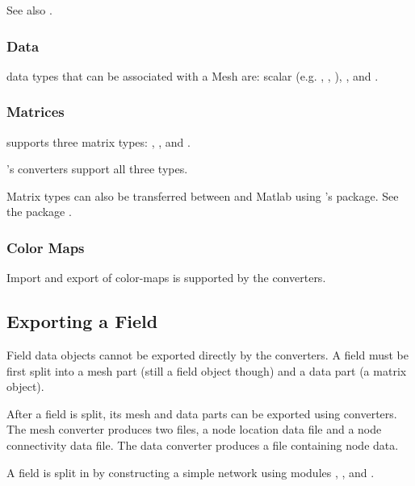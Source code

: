 See also .

\subsubsection{Data}

\sr{} data types that can be associated with a Mesh are:
scalar (e.g. , , ),
, and .


\subsubsection{Matrices}

\sr{} supports three matrix types: ,
, and .  

\sr{}'s converters support all three types.

Matrix types can also be transferred between \sr{} and Matlab using
\sr{}'s  package. See the
 package .


\subsubsection{Color Maps}

Import and export of color-maps is supported by the converters.

\subsection{Exporting a Field}
\label{sec:export_field}

Field data objects cannot be exported directly by the converters.  A
field must be first split into a mesh part (still a field object
though) and a data part (a matrix object).

After a field is split, its mesh and data parts can be exported using
converters.  The mesh converter produces two files, a node location
data file and a node connectivity data file. The data converter
produces a file containing node data.

A field is split in \sr{} by constructing a simple network using
modules , ,
and .  

